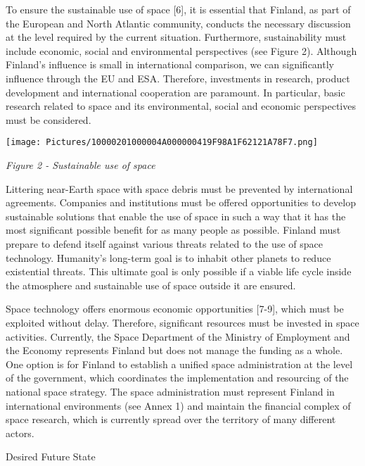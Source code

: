 To ensure the sustainable use of space {[}6{]}, it is essential that
Finland, as part of the European and North Atlantic community, conducts
the necessary discussion at the level required by the current situation.
Furthermore, sustainability must include economic, social and
environmental perspectives (see Figure 2). Although Finland's influence
is small in international comparison, we can significantly influence
through the EU and ESA. Therefore, investments in research, product
development and international cooperation are paramount. In particular,
basic research related to space and its environmental, social and
economic perspectives must be considered.

\texttt{[image: Pictures/10000201000004A000000419F98A1F62121A78F7.png]}

\protect\hypertarget{anchor-10}{}{}\emph{Figure 2 - Sustainable use of
space}

Littering near-Earth space with space debris must be prevented by
international agreements. Companies and institutions must be offered
opportunities to develop sustainable solutions that enable the use of
space in such a way that it has the most significant possible benefit
for as many people as possible. Finland must prepare to defend itself
against various threats related to the use of space technology.
Humanity's long-term goal is to inhabit other planets to reduce
existential threats. This ultimate goal is only possible if a viable
life cycle inside the atmosphere and sustainable use of space outside it
are ensured.

Space technology offers enormous economic opportunities {[}7-9{]}, which
must be exploited without delay. Therefore, significant resources must
be invested in space activities. Currently, the Space Department of the
Ministry of Employment and the Economy represents Finland but does not
manage the funding as a whole. One option is for Finland to establish a
unified space administration at the level of the government, which
coordinates the implementation and resourcing of the national space
strategy. The space administration must represent Finland in
international environments (see Annex 1) and maintain the financial
complex of space research, which is currently spread over the territory
of many different actors.

\protect\hypertarget{anchor-11}{}{}Desired Future State

